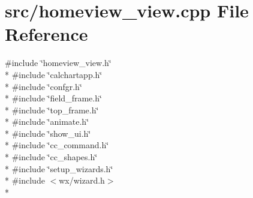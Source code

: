 \hypertarget{a00232}{\section{src/homeview\-\_\-view.cpp File Reference}
\label{a00232}
}
{\ttfamily \#include \char`\"{}homeview\-\_\-view.\-h\char`\"{}}\\*
{\ttfamily \#include \char`\"{}calchartapp.\-h\char`\"{}}\\*
{\ttfamily \#include \char`\"{}confgr.\-h\char`\"{}}\\*
{\ttfamily \#include \char`\"{}field\-\_\-frame.\-h\char`\"{}}\\*
{\ttfamily \#include \char`\"{}top\-\_\-frame.\-h\char`\"{}}\\*
{\ttfamily \#include \char`\"{}animate.\-h\char`\"{}}\\*
{\ttfamily \#include \char`\"{}show\-\_\-ui.\-h\char`\"{}}\\*
{\ttfamily \#include \char`\"{}cc\-\_\-command.\-h\char`\"{}}\\*
{\ttfamily \#include \char`\"{}cc\-\_\-shapes.\-h\char`\"{}}\\*
{\ttfamily \#include \char`\"{}setup\-\_\-wizards.\-h\char`\"{}}\\*
{\ttfamily \#include $<$wx/wizard.\-h$>$}\\*
